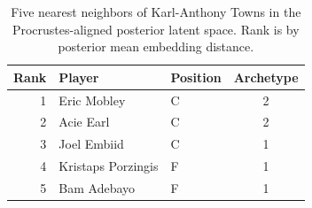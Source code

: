 \begin{table}[htbp]
  \centering\small
  \begin{tabular}{rllc}
    \toprule
    Rank & Player & Position & Archetype \\
    \midrule
    1 & Eric Mobley & C & 2 \\
    2 & Acie Earl & C & 2 \\
    3 & Joel Embiid & C & 1 \\
    4 & Kristaps Porzingis & F & 1 \\
    5 & Bam Adebayo & F & 1 \\
    \bottomrule
  \end{tabular}
  \caption{Five nearest neighbors of Karl-Anthony Towns in the Procrustes-aligned posterior latent space. Rank is by posterior mean embedding distance.}
  \label{tab:Karl_Anthony_Towns_neighbors}
\end{table}

